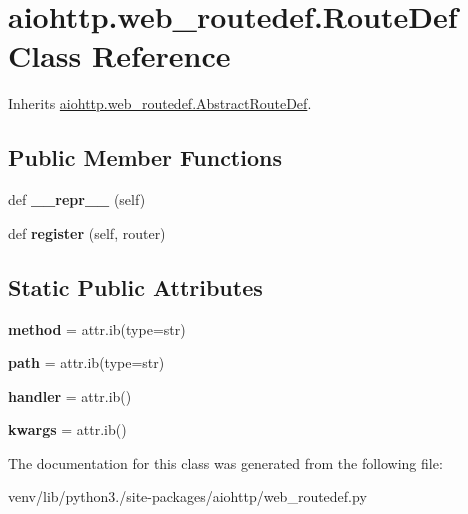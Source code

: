 \hypertarget{classaiohttp_1_1web__routedef_1_1_route_def}{}\section{aiohttp.\+web\+\_\+routedef.\+Route\+Def Class Reference}
\label{classaiohttp_1_1web__routedef_1_1_route_def}


Inherits \hyperlink{classaiohttp_1_1web__routedef_1_1_abstract_route_def}{aiohttp.\+web\+\_\+routedef.\+Abstract\+Route\+Def}.

\subsection*{Public Member Functions}
\begin{DoxyCompactItemize}
\item 
\mbox{\label{classaiohttp_1_1web__routedef_1_1_route_def_acc6bd7622493d468b6c20c26f39100d5}} 
def {\bfseries \+\_\+\+\_\+repr\+\_\+\+\_\+} (self)
\item 
\mbox{\label{classaiohttp_1_1web__routedef_1_1_route_def_a98c57caf828c30304b3bf1d5081fc677}} 
def {\bfseries register} (self, router)
\end{DoxyCompactItemize}
\subsection*{Static Public Attributes}
\begin{DoxyCompactItemize}
\item 
\mbox{\label{classaiohttp_1_1web__routedef_1_1_route_def_a3046ee9d3e7f0c7a2bec9f1d7f622099}} 
{\bfseries method} = attr.\+ib(type=str)
\item 
\mbox{\label{classaiohttp_1_1web__routedef_1_1_route_def_a45da611c10e22709c73d9be094954e97}} 
{\bfseries path} = attr.\+ib(type=str)
\item 
\mbox{\label{classaiohttp_1_1web__routedef_1_1_route_def_a7fec00c8c99de492c228f193f2c502f5}} 
{\bfseries handler} = attr.\+ib()
\item 
\mbox{\label{classaiohttp_1_1web__routedef_1_1_route_def_ae6371da70e1888e6e405b174103e9ba7}} 
{\bfseries kwargs} = attr.\+ib()
\end{DoxyCompactItemize}


The documentation for this class was generated from the following file\+:\begin{DoxyCompactItemize}
\item 
venv/lib/python3./site-\/packages/aiohttp/web\+\_\+routedef.\+py\end{DoxyCompactItemize}
